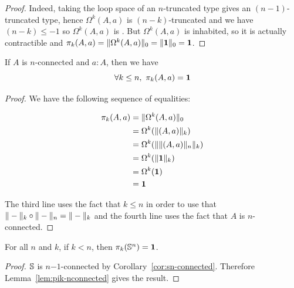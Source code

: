 \begin{proof}
  Indeed, taking the loop space of an $n$-truncated type gives an
  $(n-1)$-truncated type, hence $\Omega^k(A,a)$ is $(n-k)$-truncated and we have
  $(n-k)\le-1$ so $\Omega^k(A,a)$ is \anhprop. But $\Omega^k(A,a)$ is inhabited,
  so it is actually contractible and
  $\pi_k(A,a)=\trunc0{\Omega^k(A,a)}=\trunc0{\unit}=\unit$.
\end{proof}

\begin{lem} \label{lem:pik-nconnected}
  If $A$ is $n$-connected and $a:A$, then we have
  \[\forall k\le{}n,\ \pi_k(A,a)=\unit\]
\end{lem}

\begin{proof}
  We have the following sequence of equalities:

  \begin{align*}
    \pi_k(A,a) &= \trunc0{\Omega^k(A,a)} \\
    &= \Omega^k(\trunc k{(A,a)}) \\
    &= \Omega^k(\trunc k{\trunc n{(A,a)}}) \\
    &= \Omega^k(\trunc k{\unit}) \\
    &= \Omega^k(\unit) \\
    &= \unit
  \end{align*}

  The third line uses the fact that $k\le{}n$ in order to use that
  $\truncf k\circ\truncf n=\truncf k$ and the fourth line uses the fact that $A$ is
  $n$-connected.
\end{proof}

\begin{cor}[$\pi_{k<n}(\Sn ^n)$]
For all $n$ and $k$, if $k < n$, then $\pi_k(\Sn ^n) = \unit$.  
\end{cor}
\begin{proof}
$\Sn$ is $n\mathord{-}1$-connected by Corollary~\ref{cor:sn-connected}.  Therefore
Lemma~\ref{lem:pik-nconnected} gives the result.  
\end{proof}

